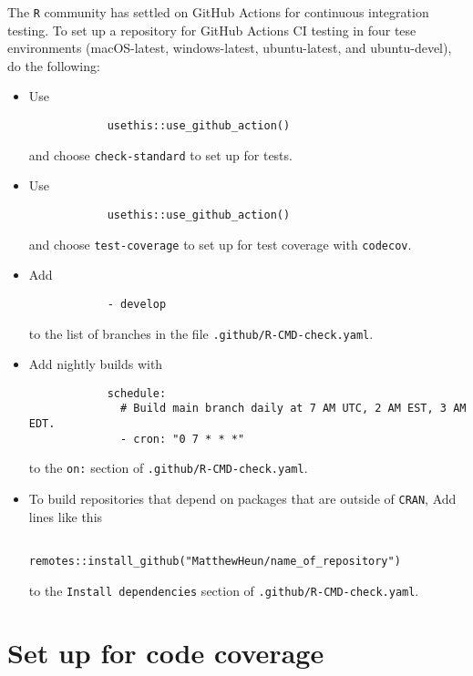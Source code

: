 \documentclass{article}
\begin{document}
The \texttt{R} community has settled on GitHub Actions for continuous integration testing.
To set up a repository for GitHub Actions CI testing in four tese environments
(macOS-latest, windows-latest, ubuntu-latest, and ubuntu-devel),
do the following:
%
\begin{itemize}

  \item Use
  		\begin{verbatim}
			usethis::use_github_action()
  	 	\end{verbatim}
		and choose \verb|check-standard| to set up for tests.

  \item Use
  		\begin{verbatim}
			usethis::use_github_action()
  	 	\end{verbatim}
		and choose \verb|test-coverage| to set up for test coverage with \verb|codecov|.

  \item Add
  		\begin{verbatim}
			- develop
		\end{verbatim}
		to the list of branches in the file \texttt{.github/R-CMD-check.yaml}.

  \item Add nightly builds with
  		\begin{verbatim}
			schedule:
			  # Build main branch daily at 7 AM UTC, 2 AM EST, 3 AM EDT.
			  - cron: "0 7 * * *"
		\end{verbatim}
	    to the \texttt{on:} section of \texttt{.github/R-CMD-check.yaml}.\

  \item To build repositories that depend on packages that are outside of \texttt{CRAN},
		Add lines like this
	        \begin{verbatim}
				remotes::install_github("MatthewHeun/name_of_repository")
			\end{verbatim}
		to the \texttt{Install dependencies} section of
		\texttt{.github/R-CMD-check.yaml}.

\end{itemize}


\section{Set up for code coverage}
\label{sec:codecov_setup}
\end{document}
